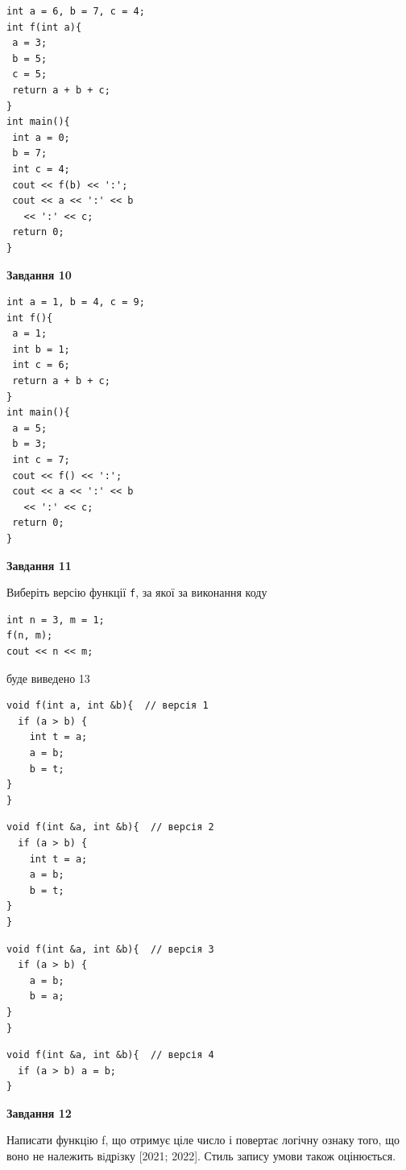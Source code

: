 \documentclass[12pt, ukrainian]{article}
\def\code#1{\Verb!#1!}
\begin{document}
{\begin {large}
\begin{minipage}[t]{7.0cm}
\begin{verbatim}
int a = 6, b = 7, c = 4;
int f(int a){
 a = 3;
 b = 5;
 c = 5;
 return a + b + c;
}
int main(){
 int a = 0;
 b = 7;
 int c = 4;
 cout << f(b) << ':';
 cout << a << ':' << b 
   << ':' << c;
 return 0;
}
\end{verbatim}



\begin{center}
\textbf{Завдання 10}
\end{center}
\vspace{-8mm}

\begin{verbatim}
int a = 1, b = 4, c = 9;
int f(){
 a = 1;
 int b = 1;
 int c = 6;
 return a + b + c;
}
int main(){
 a = 5;
 b = 3;
 int c = 7;
 cout << f() << ':';
 cout << a << ':' << b 
   << ':' << c;
 return 0;
}
\end{verbatim}

\end{minipage}
\vline \hspace{1mm}
\begin{minipage}[t]{11.0cm}

\begin{center}
\textbf{Завдання 11}
\end{center}
Виберіть версію функції \code{f}, за якої за виконання коду
\begin{verbatim}
int n = 3, m = 1;
f(n, m);
cout << n << m;
\end{verbatim}

буде виведено 13

\begin{verbatim}
void f(int a, int &b){  // версія 1
  if (a > b) {
    int t = a;
    a = b;
    b = t;
}  
}
\end{verbatim}

\vspace{-8mm}\begin{verbatim}
void f(int &a, int &b){  // версія 2
  if (a > b) {
    int t = a;
    a = b;
    b = t;
}  
}
\end{verbatim}

\vspace{-8mm}\begin{verbatim}
void f(int &a, int &b){  // версія 3
  if (a > b) {
    a = b;
    b = a;
}  
}
\end{verbatim}

\vspace{-8mm}\begin{verbatim}
void f(int &a, int &b){  // версія 4
  if (a > b) a = b;
}
\end{verbatim}



\begin{center}
\textbf{Завдання 12}
\end{center}

Написати функцiю f, що отримує ціле число і повертає логічну ознаку того, що воно не належить вiдрiзку [2021; 2022]. Стиль запису умови також оцінюється.\par

\end{minipage}

\end {large}}
\end{document}
